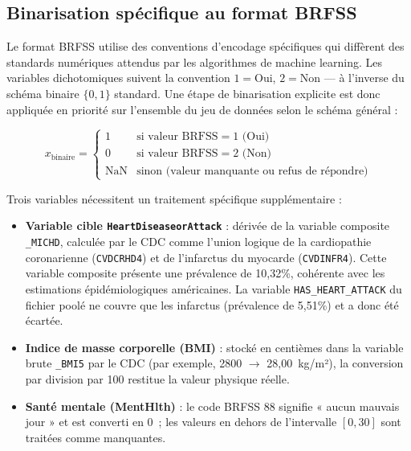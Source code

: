 \subsection{Binarisation spécifique au format BRFSS}

Le format BRFSS utilise des conventions d'encodage spécifiques qui diffèrent des standards numériques attendus par les algorithmes de machine learning. Les variables dichotomiques suivent la convention $1 = \text{Oui}$, $2 = \text{Non}$ — à l'inverse du schéma binaire $\{0, 1\}$ standard. Une étape de binarisation explicite est donc appliquée en priorité sur l'ensemble du jeu de données selon le schéma général :

\begin{equation}
x_{\text{binaire}} = \begin{cases}
1 & \text{si valeur BRFSS} = 1 \text{ (Oui)} \\
0 & \text{si valeur BRFSS} = 2 \text{ (Non)} \\
\text{NaN} & \text{sinon (valeur manquante ou refus de répondre)}
\end{cases}
\label{eq:binarisation}
\end{equation}

Trois variables nécessitent un traitement spécifique supplémentaire :

\begin{itemize}
    \item \textbf{Variable cible \texttt{HeartDiseaseorAttack}} : dérivée de la variable composite \texttt{\_MICHD}, calculée par le CDC comme l'union logique de la cardiopathie coronarienne (\texttt{CVDCRHD4}) et de l'infarctus du myocarde (\texttt{CVDINFR4}). Cette variable composite présente une prévalence de 10,32\%, cohérente avec les estimations épidémiologiques américaines. La variable \texttt{HAS\_HEART\_ATTACK} du fichier poolé ne couvre que les infarctus (prévalence de 5,51\%) et a donc été écartée.

    \item \textbf{Indice de masse corporelle (BMI)} : stocké en centièmes dans la variable brute \texttt{\_BMI5} par le CDC (par exemple, 2800 $\to$ 28,00~kg/m²), la conversion par division par 100 restitue la valeur physique réelle.

    \item \textbf{Santé mentale (MentHlth)} : le code BRFSS 88 signifie « aucun mauvais jour » et est converti en 0~; les valeurs en dehors de l'intervalle $[0, 30]$ sont traitées comme manquantes.
\end{itemize}

